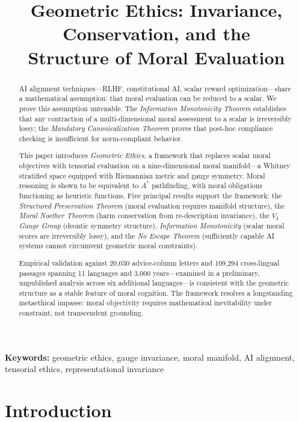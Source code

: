 \documentclass[12pt]{article}
\title{\textbf{Geometric Ethics: Invariance, Conservation, and the\\Structure of Moral Evaluation}}
\author{}
\date{}
\theoremstyle{definition}
\theoremstyle{remark}
\begin{document}
\maketitle

\begin{abstract}
AI alignment techniques---RLHF, constitutional AI, scalar reward optimization---share a mathematical assumption: that moral evaluation can be reduced to a scalar. We prove this assumption untenable. The \emph{Information Monotonicity Theorem} establishes that any contraction of a multi-dimensional moral assessment to a scalar is irreversibly lossy; the \emph{Mandatory Canonicalization Theorem} proves that post-hoc compliance checking is insufficient for norm-compliant behavior.

This paper introduces \emph{Geometric Ethics}, a framework that replaces scalar moral objectives with tensorial evaluation on a nine-dimensional moral manifold---a Whitney stratified space equipped with Riemannian metric and gauge symmetry. Moral reasoning is shown to be equivalent to $A^*$ pathfinding, with moral obligations functioning as heuristic functions. Five principal results support the framework: the \emph{Structured Preservation Theorem} (moral evaluation requires manifold structure), the \emph{Moral Noether Theorem} (harm conservation from re-description invariance), the \emph{$V_4$ Gauge Group} (deontic symmetry structure), \emph{Information Monotonicity} (scalar moral scores are irreversibly lossy), and the \emph{No Escape Theorem} (sufficiently capable AI systems cannot circumvent geometric moral constraints).

Empirical validation against 20,030 advice-column letters and 109,294 cross-lingual passages spanning 11 languages and 3,000 years---examined in a preliminary, unpublished analysis across six additional languages---is consistent with the geometric structure as a stable feature of moral cognition. The framework resolves a longstanding metaethical impasse: moral objectivity requires mathematical inevitability under constraint, not transcendent grounding.
\end{abstract}

\noindent\textbf{Keywords:} geometric ethics, gauge invariance, moral manifold, AI alignment, tensorial ethics, representational invariance


\section{Introduction}
\label{sec:introduction}
\end{document}
